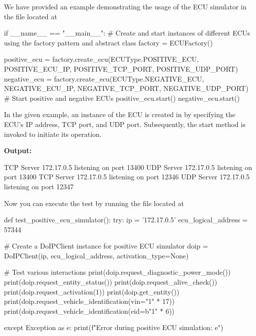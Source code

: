 We have provided an example demonstrating the usage of the ECU simulator in the file located at 
\\

\begin{pythoncode}
   if __name__ == "__main__":
      # Create and start instances of different ECUs using the factory pattern and abstract class
      factory = ECUFactory()

      positive_ecu = factory.create_ecu(ECUType.POSITIVE_ECU, POSITIVE_ECU_IP, POSITIVE_TCP_PORT, POSITIVE_UDP_PORT)
      negative_ecu = factory.create_ecu(ECUType.NEGATIVE_ECU, NEGATIVE_ECU_IP, NEGATIVE_TCP_PORT, NEGATIVE_UDP_PORT)
      # Start positive and negative ECUs
      positive_ecu.start()
      negative_ecu.start()
\end{pythoncode}

In the given example, an instance of the ECU is created in  by specifying the ECU's IP address, TCP port, and UDP port.
Subsequently, the start method is invoked to initiate its operation.

\textbf{Output:}
\begin{pythoncode}
TCP Server 172.17.0.5 listening on port 13400
UDP Server 172.17.0.5 listening on port 13400
TCP Server 172.17.0.5 listening on port 12346
UDP Server 172.17.0.5 listening on port 12347
\end{pythoncode}

Now you can execute the test by running the file located at 
\\

\begin{pythoncode}
   def test_positive_ecu_simulator():
      try:
         ip = '172.17.0.5'
         ecu_logical_address = 57344

         # Create a DoIPClient instance for positive ECU simulator
         doip = DoIPClient(ip, ecu_logical_address, activation_type=None)

         # Test various interactions
         print(doip.request_diagnostic_power_mode())
         print(doip.request_entity_status())
         print(doip.request_alive_check())
         print(doip.request_activation(1))
         print(doip.get_entity())
         print(doip.request_vehicle_identification(vin="1" * 17))
         print(doip.request_vehicle_identification(eid=b"1" * 6))

      except Exception as e:
         print(f"Error during positive ECU simulation: {e}")
\end{pythoncode}

